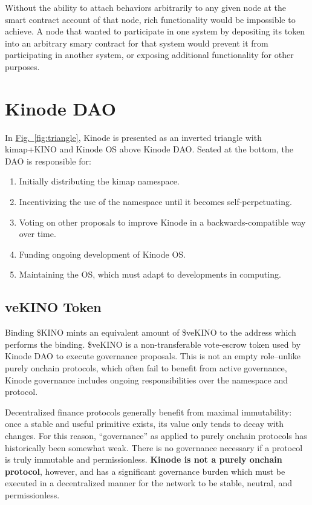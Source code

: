 \documentclass[runningheads]{llncs}
\begin{document}
Without the ability to attach behaviors arbitrarily to any given node at the smart contract account of that node,
rich functionality would be impossible to achieve. A node that wanted to participate in one system by depositing its
token into an arbitrary smary contract for that system would prevent it from participating in another system,
or exposing additional functionality for other purposes.

\section{Kinode DAO}
\label{sec:dao}

In \hyperref[fig:triangle]{Fig.~\ref{fig:triangle}}, Kinode is presented as an inverted triangle with kimap+KINO and Kinode OS above Kinode DAO.
Seated at the bottom, the DAO is responsible for:
\begin{enumerate}
    \item Initially distributing the kimap namespace.
    \item Incentivizing the use of the namespace until it becomes self-perpetuating.
    \item Voting on other proposals to improve Kinode in a backwards-compatible way over time.
    \item Funding ongoing development of Kinode OS.
    \item Maintaining the OS, which must adapt to developments in computing.
\end{enumerate}

\subsection{veKINO Token}
\label{sec:daovekino}

Binding \$KINO mints an equivalent amount of \$veKINO to the address which performs the binding.
\$veKINO is a non-transferable vote-escrow token used by Kinode DAO to execute governance proposals.
This is not an empty role–unlike purely onchain protocols, which often fail to benefit from active governance, Kinode governance includes ongoing responsibilities over the namespace and protocol.

Decentralized finance protocols generally benefit from maximal immutability: once a stable and useful primitive exists, its value only tends to decay with changes.
For this reason, ``governance'' as applied to purely onchain protocols has historically been somewhat weak.
There is no governance necessary if a protocol is truly immutable and permissionless. \textbf{Kinode is not a purely onchain protocol}, however, and has a significant governance burden which must be executed in a decentralized manner for the network to be stable, neutral, and permissionless.
\end{document}

